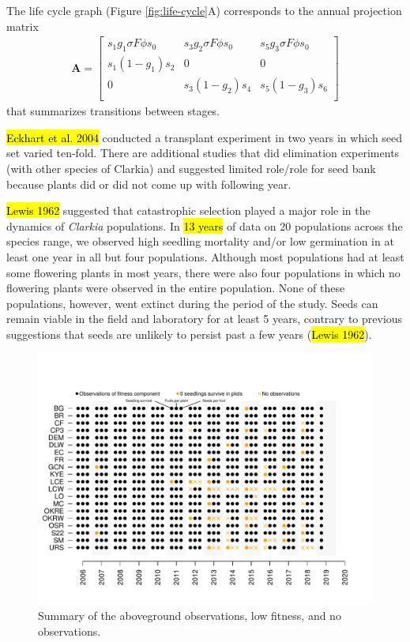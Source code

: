 \documentclass[12pt, oneside, titlepage]{article}   	%
\begin{document}
The life cycle graph (Figure \ref{fig:life-cycle}A) corresponds to the annual projection matrix
%
\begin{gather}
\bm{A} = 
\begin{bmatrix} 
s_1 g_1 \sigma F \phi s_0 & s_3 g_2 \sigma F \phi s_0 & s_5 g_3 \sigma F \phi s_0 \\
s_1 (1-g_1) s_2 & 0 & 0 \\
0 & s_3 (1-g_2) s_4  & s_5 (1-g_3) s_6  \\
\end{bmatrix}
\label{eq:projection-matrix}
\end{gather} 
%
that summarizes transitions between stages. 

\hl{Eckhart et al. 2004} conducted a transplant experiment in two years in which seed set varied ten-fold. There are additional studies that did elimination experiments (with other species of Clarkia) and suggested limited role/role for seed bank because plants did or did not come up with following year. 

\hl{Lewis 1962} suggested that catastrophic selection played a major role in the dynamics of \textit{Clarkia} populations. In \hl{13 years} of data on 20 populations across the species range, we observed high seedling mortality and/or low germination in at least one year in all but four populations. Although most populations had at least some flowering plants in most years, there were also four populations in which no flowering plants were observed in the entire population. None of these populations, however, went extinct during the period of the study. Seeds can remain viable in the field and laboratory for at least 5 years, contrary to previous suggestions that seeds are unlikely to persist past a few years (\hl{Lewis 1962}). 

\begin{figure}[!h]
       \includegraphics[width=\textwidth]{../figures/analysis/zero-fitness.pdf}  
    \caption{ Summary of the aboveground observations, low fitness, and no observations. }
 \label{fig:zero-fitness}
\end{figure}
\end{document}
